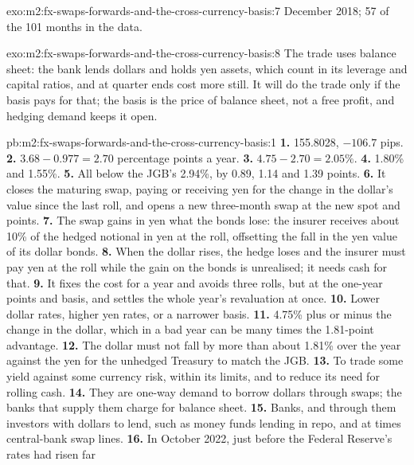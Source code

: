 \begin{solution}{exo:m2:fx-swaps-forwards-and-the-cross-currency-basis:7}
December 2018; 57 of the 101 months in the data.
\end{solution}

\begin{solution}{exo:m2:fx-swaps-forwards-and-the-cross-currency-basis:8}
The trade uses balance sheet: the bank lends dollars and holds yen assets, which
count in its leverage and capital ratios, and at quarter ends cost more still.
It will do the trade only if the basis pays for that; the basis is the price of
balance sheet, not a free profit, and hedging demand keeps it open.
\end{solution}

\begin{solution}{pb:m2:fx-swaps-forwards-and-the-cross-currency-basis:1}
\textbf{1.} 155.8028, $-106.7$ pips.
\textbf{2.} $3.68 - 0.977 = 2.70$ percentage points a year.
\textbf{3.} $4.75 - 2.70 = 2.05\%$.
\textbf{4.} 1.80\% and 1.55\%.
\textbf{5.} All below the JGB's 2.94\%, by 0.89, 1.14 and 1.39 points.
\textbf{6.} It closes the maturing swap, paying or receiving yen for the change in
the dollar's value since the last roll, and opens a new three-month swap at the
new spot and points.
\textbf{7.} The swap gains in yen what the bonds lose: the insurer receives about
10\% of the hedged notional in yen at the roll, offsetting the fall in the yen
value of its dollar bonds.
\textbf{8.} When the dollar rises, the hedge loses and the insurer must pay yen at
the roll while the gain on the bonds is unrealised; it needs cash for that.
\textbf{9.} It fixes the cost for a year and avoids three rolls, but at the one-year
points and basis, and settles the whole year's revaluation at once.
\textbf{10.} Lower dollar rates, higher yen rates, or a narrower basis.
\textbf{11.} 4.75\% plus or minus the change in the dollar, which in a bad year can
be many times the 1.81-point advantage.
\textbf{12.} The dollar must not fall by more than about 1.81\% over the year against
the yen for the unhedged Treasury to match the JGB.
\textbf{13.} To trade some yield against some currency risk, within its limits, and
to reduce its need for rolling cash.
\textbf{14.} They are one-way demand to borrow dollars through swaps; the banks that
supply them charge for balance sheet.
\textbf{15.} Banks, and through them investors with dollars to lend, such as money
funds lending in repo, and at times central-bank swap lines.
\textbf{16.} In October 2022, just before the Federal Reserve's rates had risen far

\end{solution}
